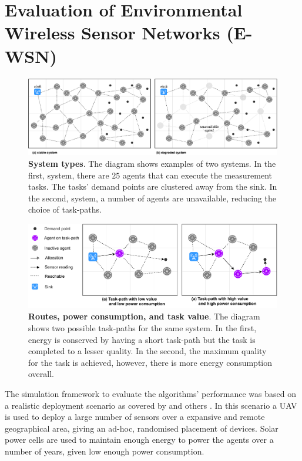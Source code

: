 \section{Evaluation of Environmental Wireless Sensor Networks (E-WSN)}
\label{section:experimental}	
\begin{figure}[ht]
	\centering
	\includegraphics[width=0.9\linewidth, trim={25pt 0pt 25pt 0pt, clip}]{system-types}
	\caption{\textbf{System types}. The diagram shows examples of two systems. In the first, \simulationSimple{}{} system, there are $25$ agents that can execute the measurement tasks. The tasks' demand points are clustered away from the sink. In the second, \simulationNodeFailure{}{} system, a number of agents are unavailable, reducing the choice of task-paths.}
	\label{fig:system-types}
\end{figure}
\begin{figure}[ht]
	\centering
	\includegraphics[width=0.9\linewidth, trim={25pt 0pt 25pt 0pt, clip}]{route-types}
	\caption{\textbf{Routes, power consumption, and task value}. The diagram shows two possible task-paths for the same system. In the first, energy is conserved by having a short task-path but the task is completed to a lesser quality. In the second, the maximum quality for the task is achieved, however, there is more energy consumption overall.}
	\label{fig:route_types}
\end{figure}

The simulation framework to evaluate the algorithms' performance was based on a realistic deployment scenario as covered by  \cite{Gomez2015} and others \citep{Jha2016, Avram}. In this scenario a UAV is used to deploy a large number of sensors over a expansive and remote geographical area, giving an ad-hoc, randomised placement of devices. Solar power cells are used to maintain enough energy to power the agents over a number of years, given low enough power consumption. 

